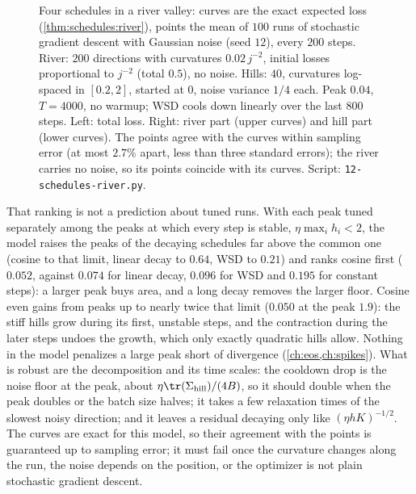 \begin{refsection}
\begin{figure}[t]
\begin{fullwidth}
\end{fullwidth}
\caption{Four schedules in a river valley: curves are the exact expected loss (\cref{thm:schedules:river}), points the mean of $100$ runs of stochastic gradient descent with Gaussian noise (seed $12$), every $200$ steps. River: $200$ directions with curvatures $0.02\,j^{-2}$, initial losses proportional to $j^{-2}$ (total $0.5$), no noise. Hills: $40$, curvatures log-spaced in $[0.2,2]$, started at $0$, noise variance $1/4$ each. Peak $0.04$, $T=4000$, no warmup; WSD cools down linearly over the last $800$ steps. Left: total loss. Right: river part (upper curves) and hill part (lower curves). The points agree with the curves within sampling error (at most $2.7\%$ apart, less than three standard errors); the river carries no noise, so its points coincide with its curves. Script: \texttt{12-schedules-river.py}.}
\label{fig:schedules:river}
\end{figure}

That ranking is not a prediction about tuned runs. With each peak tuned separately among the peaks at which every step is stable, $\eta\max_ih_i<2$, the model raises the peaks of the decaying schedules far above the common one (cosine to that limit, linear decay to $0.64$, WSD to $0.21$) and ranks cosine first ($0.052$, against $0.074$ for linear decay, $0.096$ for WSD and $0.195$ for constant steps): a larger peak buys area, and a long decay removes the larger floor. Cosine even gains from peaks up to nearly twice that limit ($0.050$ at the peak $1.9$): the stiff hills grow during its first, unstable steps, and the contraction during the later steps undoes the growth, which only exactly quadratic hills allow. Nothing in the model penalizes a large peak short of divergence (\cref{ch:eos,ch:spikes}). What is robust are the decomposition and its time scales: the cooldown drop is the noise floor at the peak, about $\eta\tr(\Sigma_{\mathrm{hill}})/(4B)$, so it should double when the peak doubles or the batch size halves; it takes a few relaxation times of the slowest noisy direction; and it leaves a residual decaying only like $(\eta hK)^{-1/2}$. The curves are exact for this model, so their agreement with the points is guaranteed up to sampling error; it must fail once the curvature changes along the run, the noise depends on the position, or the optimizer is not plain stochastic gradient descent.


\end{refsection}
